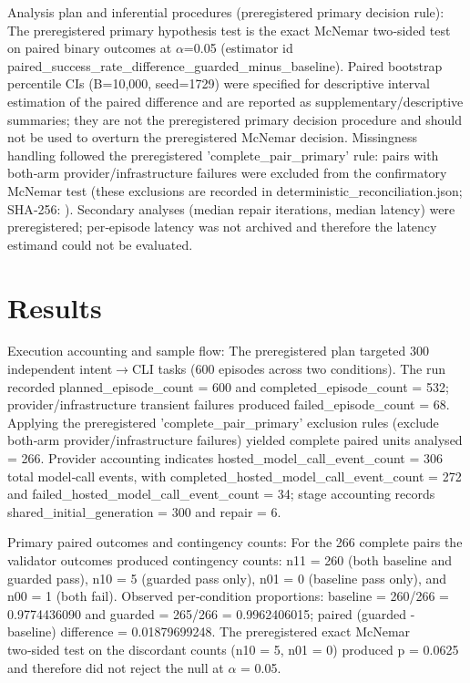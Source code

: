 \documentclass[conference]{IEEEtran}
\begin{document}
Analysis plan and inferential procedures (preregistered primary decision rule): The preregistered primary hypothesis test is the exact McNemar two‑sided test on paired binary outcomes at \ensuremath{\alpha}=0.05 (estimator id paired\_success\_rate\_difference\_guarded\_minus\_baseline). Paired bootstrap percentile CIs (B=10,000, seed=1729) were specified for descriptive interval estimation of the paired difference and are reported as supplementary/descriptive summaries; they are not the preregistered primary decision procedure and should not be used to overturn the preregistered McNemar decision. Missingness handling followed the preregistered 'complete\_pair\_primary' rule: pairs with both‑arm provider/infrastructure failures were excluded from the confirmatory McNemar test (these exclusions are recorded in deterministic\_reconciliation.json; SHA‑256: ). Secondary analyses (median repair iterations, median latency) were preregistered; per‑episode latency was not archived and therefore the latency estimand could not be evaluated.

\section{Results}
Execution accounting and sample flow: The preregistered plan targeted 300 independent intent\ensuremath{\rightarrow}CLI tasks (600 episodes across two conditions). The run recorded planned\_episode\_count = 600 and completed\_episode\_count = 532; provider/infrastructure transient failures produced failed\_episode\_count = 68. Applying the preregistered 'complete\_pair\_primary' exclusion rules (exclude both‑arm provider/infrastructure failures) yielded complete paired units analysed = 266. Provider accounting indicates hosted\_model\_call\_event\_count = 306 total model‑call events, with completed\_hosted\_model\_call\_event\_count = 272 and failed\_hosted\_model\_call\_event\_count = 34; stage accounting records shared\_initial\_generation = 300 and repair = 6.

Primary paired outcomes and contingency counts: For the 266 complete pairs the validator outcomes produced contingency counts: n11 = 260 (both baseline and guarded pass), n10 = 5 (guarded pass only), n01 = 0 (baseline pass only), and n00 = 1 (both fail). Observed per‑condition proportions: baseline = 260/266 = 0.9774436090 and guarded = 265/266 = 0.9962406015; paired (guarded - baseline) difference = 0.01879699248. The preregistered exact McNemar two‑sided test on the discordant counts (n10 = 5, n01 = 0) produced p = 0.0625 and therefore did not reject the null at \ensuremath{\alpha} = 0.05.
\end{document}
